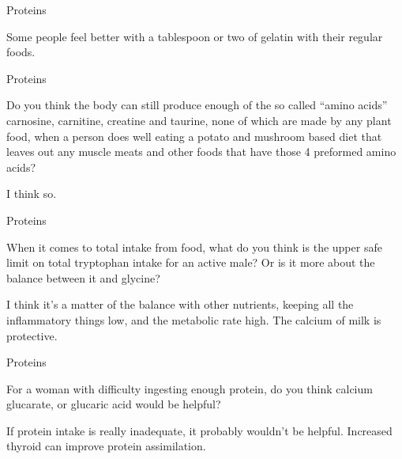 \documentclass[11pt,oneside,openany,extrafontsizes]{memoir}
\begin{document}
\begin{standalonequote}{Proteins}

    \begin{answer}
      Some people feel better with a tablespoon or two of gelatin with their regular foods.
    \end{answer}
\end{standalonequote}

\begin{qaexchange}{Proteins}

    \begin{question}
        Do you think the body can still produce enough of the so called \enquote{amino acids} carnosine, carnitine, creatine and taurine, none of which are made by any plant food, when a person does well eating a potato and mushroom based diet that leaves out any muscle meats and other foods that have those 4 preformed amino acids?
    \end{question}

    \begin{answer}
      I think so.
    \end{answer}
\end{qaexchange}

\begin{qaexchange}{Proteins}

    \begin{question}
        When it comes to total intake from food, what do you think is the upper safe limit on total tryptophan intake for an active male? Or is it more about the balance between it and glycine?
    \end{question}

    \begin{answer}
      I think it's a matter of the balance with other nutrients, keeping all the inflammatory things low, and the metabolic rate high. The calcium of milk is protective.
    \end{answer}
\end{qaexchange}

\begin{qaexchange}{Proteins}

    \begin{question}
        For a woman with difficulty ingesting enough protein, do you think calcium glucarate, or glucaric acid would be helpful?
    \end{question}

    \begin{answer}
      If protein intake is really inadequate, it probably wouldn't be helpful. Increased thyroid can improve protein assimilation.
    \end{answer}
\end{qaexchange}
\end{document}
